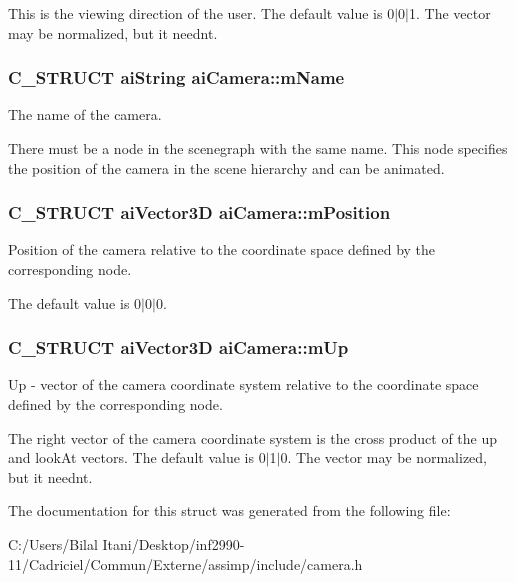 This is the viewing direction of the user. The default value is 0$\vert$0$\vert$1. The vector may be normalized, but it needn\textquotesingle{}t. 
\subsubsection[{\texorpdfstring{m\+Name}{mName}}]{\setlength{\rightskip}{0pt plus 5cm}C\+\_\+\+S\+T\+R\+U\+CT {\bf ai\+String} ai\+Camera\+::m\+Name}\hypertarget{structai_camera_aa6a5fe5e04b3db1b23f69eb9910c6816}{}\label{structai_camera_aa6a5fe5e04b3db1b23f69eb9910c6816}
The name of the camera.

There must be a node in the scenegraph with the same name. This node specifies the position of the camera in the scene hierarchy and can be animated. 
\subsubsection[{\texorpdfstring{m\+Position}{mPosition}}]{\setlength{\rightskip}{0pt plus 5cm}C\+\_\+\+S\+T\+R\+U\+CT {\bf ai\+Vector3D} ai\+Camera\+::m\+Position}\hypertarget{structai_camera_a518617ea192ca0698e748a4399e7c3a5}{}\label{structai_camera_a518617ea192ca0698e748a4399e7c3a5}
Position of the camera relative to the coordinate space defined by the corresponding node.

The default value is 0$\vert$0$\vert$0. 
\subsubsection[{\texorpdfstring{m\+Up}{mUp}}]{\setlength{\rightskip}{0pt plus 5cm}C\+\_\+\+S\+T\+R\+U\+CT {\bf ai\+Vector3D} ai\+Camera\+::m\+Up}\hypertarget{structai_camera_a7fb42b287389b4f99c883098268d6d1a}{}\label{structai_camera_a7fb42b287389b4f99c883098268d6d1a}
\textquotesingle{}Up\textquotesingle{} -\/ vector of the camera coordinate system relative to the coordinate space defined by the corresponding node.

The \textquotesingle{}right\textquotesingle{} vector of the camera coordinate system is the cross product of the up and look\+At vectors. The default value is 0$\vert$1$\vert$0. The vector may be normalized, but it needn\textquotesingle{}t. 

The documentation for this struct was generated from the following file\+:\begin{DoxyCompactItemize}
\item 
C\+:/\+Users/\+Bilal Itani/\+Desktop/inf2990-\/11/\+Cadriciel/\+Commun/\+Externe/assimp/include/camera.\+h\end{DoxyCompactItemize}
